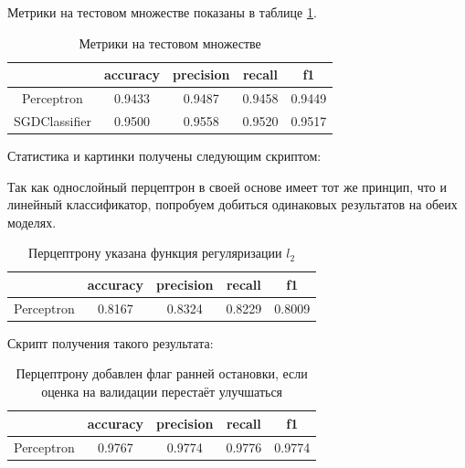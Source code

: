Метрики на тестовом множестве показаны в таблице \ref{tbl:first_blobs_metrics}.
\begin{table}[h]
	\centering
	\begin{tabular}{|c|c|c|c|c|}
		\hline
		& \textbf{accuracy} & \textbf{precision} & \textbf{recall} & \textbf{f1} \\\hline
		Perceptron    & 0.9433 & 0.9487 & 0.9458 & 0.9449 \\\hline
		SGDClassifier & 0.9500 & 0.9558 & 0.9520 & 0.9517 \\\hline
	\end{tabular}
	\caption{Метрики на тестовом множестве}
	\label{tbl:first_blobs_metrics}
\end{table}

Статистика и картинки получены следующим скриптом:\\
\noindent{}

Так как однослойный перцептрон в своей основе имеет тот же принцип, что и линейный классификатор, попробуем добиться одинаковых результатов на обеих моделях. 


\begin{table}[h]
	\centering
	\begin{tabular}{|c|c|c|c|c|}
		\hline
		& \textbf{accuracy} & \textbf{precision} & \textbf{recall} & \textbf{f1} \\\hline
		Perceptron    & 0.8167 & 0.8324 & 0.8229 & 0.8009 \\\hline
	\end{tabular}
	\caption{Перцептрону указана функция регуляризации \textit{$l_2$}}
\end{table}

Скрипт получения такого результата:

\noindent{}

\begin{table}[h]
	\centering
	\begin{tabular}{|c|c|c|c|c|}
		\hline
		& \textbf{accuracy} & \textbf{precision} & \textbf{recall} & \textbf{f1} \\\hline
		Perceptron    & 0.9767 & 0.9774 & 0.9776 & 0.9774 \\\hline
	\end{tabular}
	\caption{Перцептрону добавлен флаг ранней остановки, если оценка на валидации перестаёт улучшаться}
\end{table}


